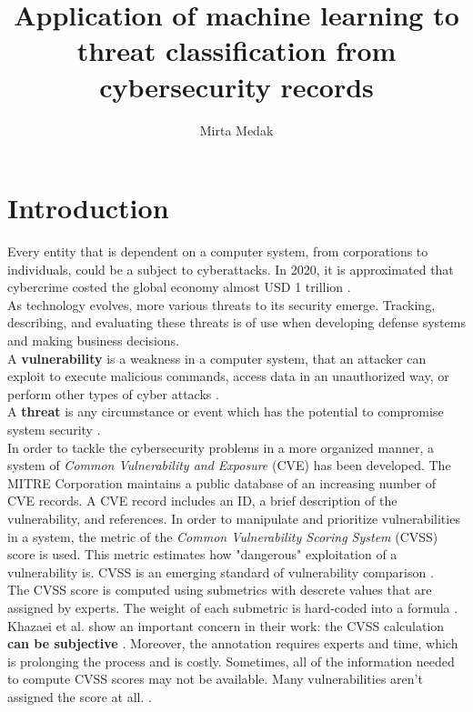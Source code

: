 \documentclass[times, utf8, zavrsni, english]{fer}
\begin{document}


\title{Application of machine learning to threat classification from cybersecurity records}


\author{Mirta Medak}

\maketitle

\zahvala{}

\tableofcontents

\chapter{Introduction}
Every entity that is dependent on a computer system, from corporations to individuals, could be a subject to cyberattacks. In 2020, it is approximated that cybercrime costed the global economy almost USD 1 trillion \citep{cremer}. \\
As technology evolves, more various threats to its security emerge.
Tracking, describing, and evaluating these threats is of use when developing defense systems and making business decisions. \\
A \textbf{vulnerability} is a weakness in a computer system, that an attacker can exploit to execute malicious commands, access data in an unauthorized way, or perform other types of cyber attacks \citep{humayun}. \\
A \textbf{threat} is any circumstance or event which has the potential to compromise system security \citep{FER}. \\
In order to tackle the cybersecurity problems in a more organized manner, a system of \emph{Common Vulnerability and Exposure} (CVE) has been developed. The MITRE Corporation maintains a public database of an increasing number of CVE records.
A CVE record includes an ID, a brief description of the vulnerability, and references.
In order to manipulate and prioritize vulnerabilities in a system, the metric of the \emph{Common Vulnerability Scoring System} (CVSS) score is used. This metric estimates how "dangerous" exploitation of a vulnerability is. CVSS is an emerging standard of vulnerability comparison \citep{khazaei}. \\
The CVSS score is computed using submetrics with descrete values that are assigned by experts. The weight of each submetric is hard-coded into a formula \citep{bozorgi}. Khazaei et al. show an important concern in their work: the CVSS calculation \textbf{can be subjective} \citep{khazaei}.
Moreover, the annotation requires experts and time, which is prolonging the process and is costly.
Sometimes, all of the information needed to compute CVSS scores may not be available. Many vulnerabilities aren't assigned the score at all. \citep{vulnerwatch}.\\
\end{document}
